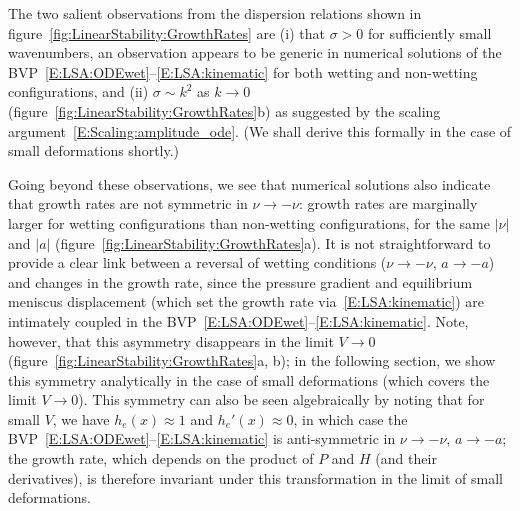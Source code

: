 \documentclass{jfm}
\newcommand{\blue}[1]{{\color{blue} #1}}
\newcommand{\aspect}{a} %
\begin{document}

The two salient observations from the dispersion relations shown in figure~\ref{fig:LinearStability:GrowthRates} are (i) that $\sigma > 0$ for sufficiently small wavenumbers, an observation appears to be generic in numerical solutions of the BVP~\eqref{E:LSA:ODEwet}--\eqref{E:LSA:kinematic} for both wetting and non-wetting configurations, and (ii) $\sigma\sim k^2$ as $k \to 0$ (figure~\ref{fig:LinearStability:GrowthRates}b) as suggested by the scaling argument~\eqref{E:Scaling:amplitude_ode}. (We shall derive this formally in the case of small deformations shortly.)

Going beyond these observations, we see that numerical solutions also indicate that growth rates are not symmetric in $\nu \to -\nu$: growth rates are marginally larger for wetting configurations than non-wetting configurations, for the same $|\nu|$ and $|\aspect|$ (figure~\ref{fig:LinearStability:GrowthRates}a). It is not straightforward to provide a clear link between a reversal of wetting conditions ($\nu \to -\nu$, $a \to -a$) and changes in the growth rate, since the pressure gradient and equilibrium meniscus displacement (which set the growth rate via~\eqref{E:LSA:kinematic}) are intimately coupled in the BVP~\eqref{E:LSA:ODEwet}--\eqref{E:LSA:kinematic}. Note, however, that this asymmetry disappears in the limit $V \to 0$ (figure~\ref{fig:LinearStability:GrowthRates}a, b); in the following section, we show this symmetry analytically in the case of small deformations (which covers the limit $V \to 0$). This symmetry can also be seen algebraically by noting that for small $V$, we have $h_e(x)\approx 1$ and $h_e'(x) \approx 0$, in which case the BVP~\eqref{E:LSA:ODEwet}--\eqref{E:LSA:kinematic} is anti-symmetric in $\nu \to -\nu$, $a \to -a$; the growth rate, which depends on the product of $P$ and $H$ (and their derivatives), is therefore invariant under this transformation in the limit of small deformations. %
\end{document}

